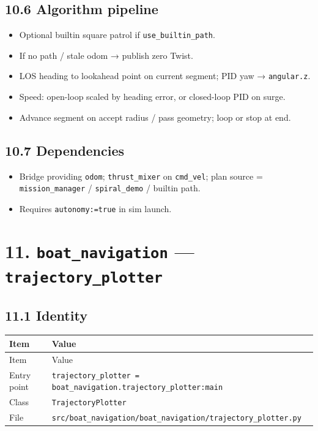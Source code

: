 \subsection{10.6 Algorithm pipeline}


\begin{itemize}[leftmargin=*]
\item Optional builtin square patrol if \texttt{use\_builtin\_path}.
\item If no path / stale odom → publish zero Twist.
\item LOS heading to lookahead point on current segment; PID yaw → \texttt{angular.z}.
\item Speed: open-loop scaled by heading error, or closed-loop PID on surge.
\item Advance segment on accept radius / pass geometry; loop or stop at end.
\end{itemize}


\subsection{10.7 Dependencies}


\begin{itemize}[leftmargin=*]
\item Bridge providing \texttt{odom}; \texttt{thrust\_mixer} on \texttt{cmd\_vel}; plan source = \texttt{mission\_manager} / \texttt{spiral\_demo} / builtin path.
\item Requires \texttt{autonomy:=true} in sim launch.
\end{itemize}




\section{11. \texttt{boat\_navigation} --- \texttt{trajectory\_plotter}}


\subsection{11.1 Identity}


\begin{center}
\small
\begin{longtable}{@{}lp{10cm}@{}}
\toprule
Item & Value \\
\midrule
\endfirsthead
\toprule
Item & Value \\
\midrule
\endhead
Entry point & \texttt{trajectory\_plotter = boat\_navigation.trajectory\_plotter:main} \\
Class & \texttt{TrajectoryPlotter} \\
File & \texttt{src/boat\_navigation/boat\_navigation/trajectory\_plotter.py} \\
\bottomrule
\end{longtable}
\end{center}



